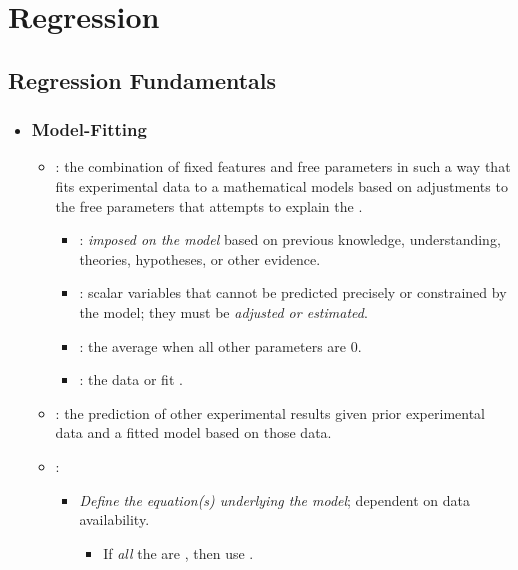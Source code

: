 \chapter{Regression}

\section{Regression Fundamentals}
\begin{itemize}
  \item[]
  
  \subsection{Model-Fitting}
  \begin{itemize}
    \item {}: the combination of fixed features and free parameters in such a way that fits experimental data to a mathematical models based on adjustments to the free parameters that attempts to explain the .
      \begin{itemize}
        \item {}:  \emph{imposed on the model} based on previous knowledge, understanding, theories, hypotheses, or other evidence. 
        \item {}: scalar variables that cannot be predicted precisely or constrained by the model; they must be \emph{adjusted or estimated}.
        \item {}: the average when all other parameters are 0.
        \item {}: the data  or fit .
      \end{itemize}
    \item {}: the prediction of other experimental results given prior experimental data and a fitted model based on those data.
    \item {}:
    \begin{itemize}
      \item \emph{Define the equation(s) underlying the model}; dependent on data availability. %
        \begin{itemize}
          \item If \emph{all} the  are \hyperref[Subsection: Data Types]{}, then use \hyperref[Chapter: Analysis of Variance]{}.

\end{itemize}
\end{itemize}
\end{itemize}
\end{itemize}

